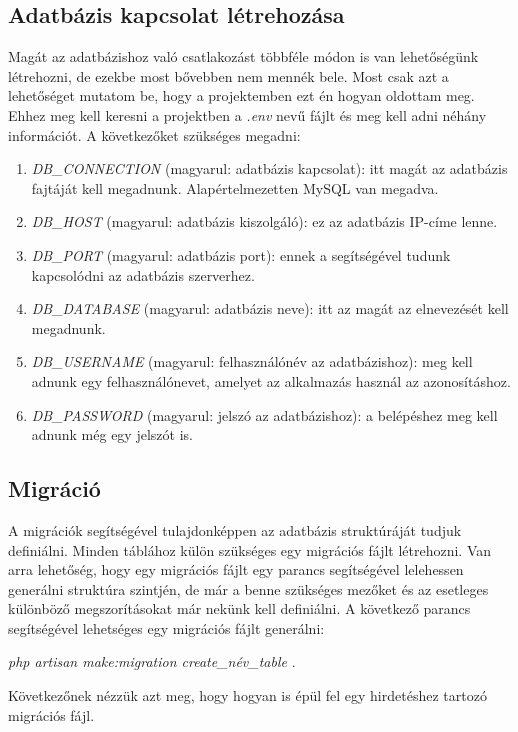 \documentclass[]{thesis-ekf}
\theoremstyle{definition}
\theoremstyle{remark}
\begin{document}
	\subsection{Adatbázis kapcsolat létrehozása}
		Magát az adatbázishoz való csatlakozást többféle módon is van lehetőségünk létrehozni, de ezekbe most bővebben nem mennék bele. Most csak azt a lehetőséget mutatom be, hogy a projektemben ezt én hogyan oldottam meg. Ehhez meg kell keresni a projektben a \emph{.env} nevű fájlt és meg kell adni néhány információt. A következőket szükséges megadni:
		\begin{enumerate}
			\item \emph{DB\_CONNECTION} (magyarul: adatbázis kapcsolat): itt magát az adatbázis fajtáját kell megadnunk. Alapértelmezetten MySQL van megadva. 
			\item \emph{DB\_HOST} (magyarul: adatbázis kiszolgáló): ez az adatbázis IP-címe lenne.
			\item \emph{DB\_PORT} (magyarul: adatbázis port): ennek a segítségével tudunk kapcsolódni az adatbázis szerverhez. 
			\item \emph{DB\_DATABASE} (magyarul: adatbázis neve): itt az magát az elnevezését kell megadnunk.
			\item \emph{DB\_USERNAME} (magyarul: felhasználónév az adatbázishoz): meg kell adnunk egy felhasználónevet, amelyet az alkalmazás használ az azonosításhoz.
			\item \emph{DB\_PASSWORD} (magyarul: jelszó az adatbázishoz): a belépéshez meg kell adnunk még egy jelszót is.
		\end{enumerate}
	\subsection{Migráció}\label{sb-migracio}
		A migrációk segítségével tulajdonképpen az adatbázis struktúráját tudjuk definiálni. Minden táblához külön szükséges egy migrációs fájlt létrehozni. Van arra lehetőség, hogy egy migrációs fájlt egy parancs segítségével lelehessen generálni struktúra szintjén, de már a benne szükséges mezőket és az esetleges különböző megszorításokat már nekünk kell definiálni. A következő parancs segítségével lehetséges egy migrációs fájlt generálni:
		\begin{center} 
			\emph{php artisan make:migration create\_név\_table} .
		\end{center}
		Következőnek nézzük azt meg, hogy hogyan is épül fel egy hirdetéshez tartozó migrációs fájl.
	
		
		
\end{document}

